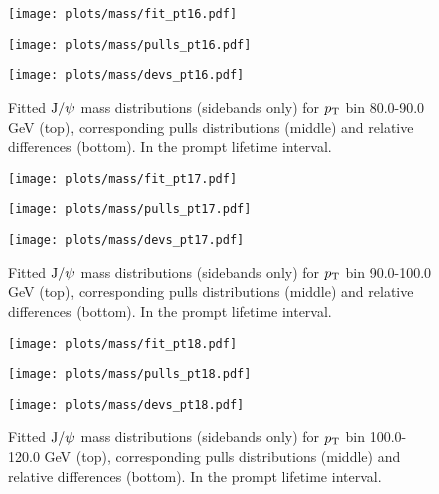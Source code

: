 \pagebreak

\begin{figure}[h!]
\centering
\texttt{[image: plots/mass/fit\_pt16.pdf]}

\texttt{[image: plots/mass/pulls\_pt16.pdf]}

\texttt{[image: plots/mass/devs\_pt16.pdf]}

\caption{Fitted $\text{J/}\psi$ mass distributions (sidebands only) for $p_\text{T}$ bin 80.0-90.0 GeV (top), corresponding pulls distributions (middle) and relative differences (bottom). In the prompt lifetime interval.}\label{f:m_fit_16}
\end{figure}

\pagebreak

\begin{figure}[h!]
\centering
\texttt{[image: plots/mass/fit\_pt17.pdf]}

\texttt{[image: plots/mass/pulls\_pt17.pdf]}

\texttt{[image: plots/mass/devs\_pt17.pdf]}

\caption{Fitted $\text{J/}\psi$ mass distributions (sidebands only) for $p_\text{T}$ bin 90.0-100.0 GeV (top), corresponding pulls distributions (middle) and relative differences (bottom). In the prompt lifetime interval.}\label{f:m_fit_17}
\end{figure}

\pagebreak

\begin{figure}[h!]
\centering
\texttt{[image: plots/mass/fit\_pt18.pdf]}

\texttt{[image: plots/mass/pulls\_pt18.pdf]}

\texttt{[image: plots/mass/devs\_pt18.pdf]}

\caption{Fitted $\text{J/}\psi$ mass distributions (sidebands only) for $p_\text{T}$ bin 100.0-120.0 GeV (top), corresponding pulls distributions (middle) and relative differences (bottom). In the prompt lifetime interval.}\label{f:m_fit_18}
\end{figure}

\pagebreak

